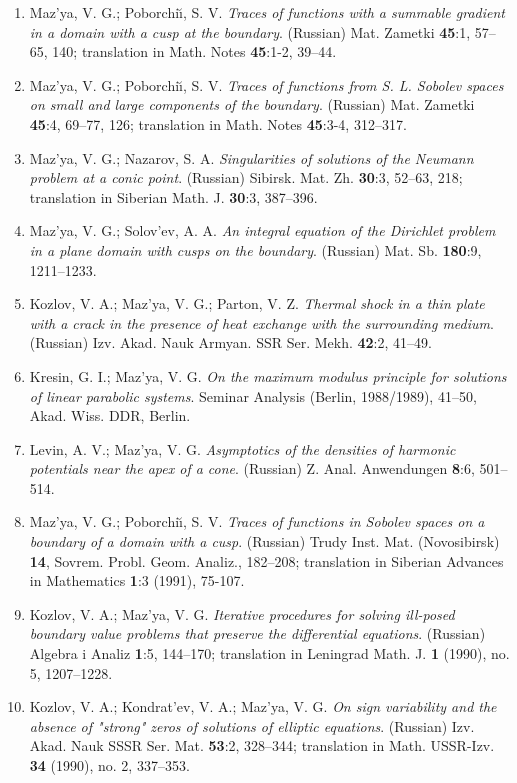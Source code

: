 \documentclass{article}
\begin{document}
\begin{enumerate}
{\bf 1989}
\item Maz'ya, V. G.; Poborchi{\u\i}, S. V. {\it Traces of functions
with a
summable gradient in a domain with a
cusp at the boundary}. (Russian) Mat. Zametki {\bf 45}:1, 57--65, 140;
translation in Math. Notes {\bf 45}:1-2,
39--44.
\item Maz'ya, V. G.; Poborchi{\u\i}, S. V. {\it Traces of functions
from S.
L. Sobolev spaces on
small and large components of the boundary}. (Russian) Mat. Zametki
{\bf
45}:4, 69--77, 126; translation in Math. Notes
{\bf 45}:3-4, 312--317.
\item Maz'ya, V. G.; Nazarov, S. A. {\it Singularities of solutions of
the
Neumann problem at a
conic point}. (Russian) Sibirsk. Mat. Zh. {\bf 30}:3, 52--63, 218;
translation in Siberian Math. J. {\bf 30}:3,
387--396.
\item Maz'ya, V. G.; Solov'ev, A. A. {\it An integral equation of the
Dirichlet problem in a plane domain with cusps on the
boundary}. (Russian) Mat. Sb. {\bf 180}:9, 1211--1233.
\item Kozlov, V. A.; Maz'ya, V. G.; Parton, V. Z. {\it Thermal shock
in a
thin plate with a crack in the
presence of heat exchange with the surrounding medium}. (Russian) Izv.
Akad. Nauk Armyan. SSR Ser. Mekh. {\bf 42}:2,
41--49.
\item Kresin, G. I.; Maz'ya, V. G. {\it On the maximum modulus
principle
for solutions of linear parabolic systems}.
Seminar Analysis (Berlin, 1988/1989), 41--50, Akad. Wiss. DDR, Berlin.
\item Levin, A. V.; Maz'ya, V. G. {\it Asymptotics of the densities of
harmonic potentials near the apex of a cone}.
(Russian) Z. Anal. Anwendungen {\bf 8}:6, 501--514.
\item Maz'ya, V. G.; Poborchi{\u\i}, S. V. {\it Traces of functions in
Sobolev spaces on a boundary of a
domain with a cusp}. (Russian) Trudy Inst. Mat. (Novosibirsk) {\bf
14},
Sovrem. Probl. Geom. Analiz., 182--208; translation in
Siberian Advances in Mathematics {\bf 1}:3 (1991), 75-107.
\item Kozlov, V. A.; Maz'ya, V. G. {\it Iterative procedures for
solving
ill-posed boundary value problems that preserve the
differential equations}. (Russian) Algebra i Analiz {\bf 1}:5,
144--170;
translation in Leningrad Math. J. {\bf 1} (1990), no.
5, 1207--1228.
\item Kozlov, V. A.; Kondrat'ev, V. A.; Maz'ya, V. G. {\it On sign
variability and the absence of "strong" zeros
of solutions of elliptic equations}. (Russian) Izv. Akad. Nauk SSSR
Ser.
Mat. {\bf 53}:2, 328--344; translation in Math.
USSR-Izv. {\bf 34} (1990), no. 2, 337--353.
\hfill\break


\end{enumerate}
\end{document}
